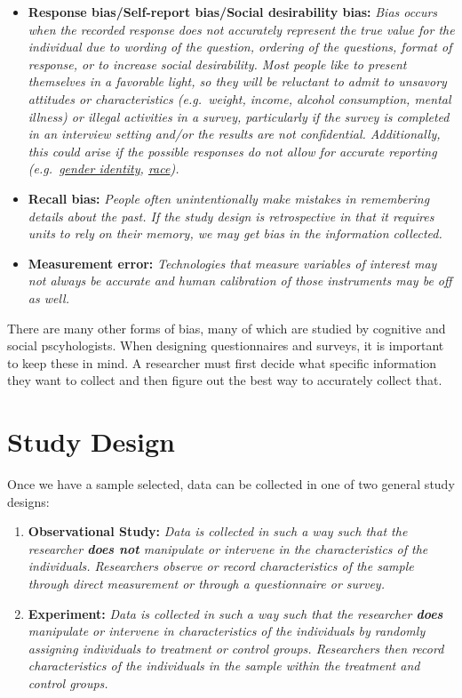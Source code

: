 \documentclass[
]{book}
\begin{document}
\begin{itemize}
\item
  \textbf{Response bias/Self-report bias/Social desirability bias:} \emph{Bias occurs when the recorded response does not accurately represent the true value for the individual due to wording of the question, ordering of the questions, format of response, or to increase social desirability. Most people like to present themselves in a favorable light, so they will be reluctant to admit to unsavory attitudes or characteristics (e.g.~weight, income, alcohol consumption, mental illness) or illegal activities in a survey, particularly if the survey is completed in an interview setting and/or the results are not confidential. Additionally, this could arise if the possible responses do not allow for accurate reporting (e.g.~\href{https://www.hrc.org/resources/collecting-transgender-inclusive-gender-data-in-workplace-and-other-surveys}{gender identity}, \href{https://www.pewsocialtrends.org/interactives/multiracial-timeline/}{race}).}
\item
  \textbf{Recall bias:} \emph{People often unintentionally make mistakes in remembering details about the past. If the study design is retrospective in that it requires units to rely on their memory, we may get bias in the information collected.}
\item
  \textbf{Measurement error:} \emph{Technologies that measure variables of interest may not always be accurate and human calibration of those instruments may be off as well.}
\end{itemize}

There are many other forms of bias, many of which are studied by cognitive and social pscyhologists. When designing questionnaires and surveys, it is important to keep these in mind. A researcher must first decide what specific information they want to collect and then figure out the best way to accurately collect that.

\hypertarget{study-design}{%
\section{Study Design}\label{study-design}}

Once we have a sample selected, data can be collected in one of two general study designs:

\begin{enumerate}
\def\labelenumi{\arabic{enumi}.}
\item
  \textbf{Observational Study:} \emph{Data is collected in such a way such that the researcher \textbf{does not} manipulate or intervene in the characteristics of the individuals. Researchers observe or record characteristics of the sample through direct measurement or through a questionnaire or survey.}
\item
  \textbf{Experiment:} \emph{Data is collected in such a way such that the researcher \textbf{does} manipulate or intervene in characteristics of the individuals by randomly assigning individuals to treatment or control groups. Researchers then record characteristics of the individuals in the sample within the treatment and control groups.}
\end{enumerate}
\end{document}
